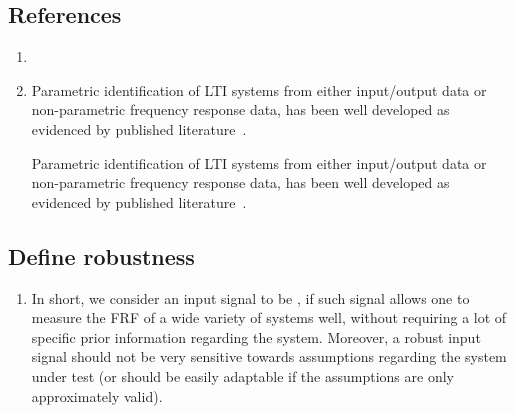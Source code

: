 \documentclass{responseletter}
\begin{document}
\subsection{References}
\begin{enumerate}
\item 
{}
\item 
{}
\begin{oldquote}
Parametric identification of \gls{LTI} systems from either input/output data or non-parametric frequency response data, has been well developed as evidenced by published literature~\citep{Pintelon2012,Ljung1999,Schoukens1999,Pintelon1998}.
\end{oldquote}
\begin{newquote}
Parametric identification of \gls{LTI} systems from either input/output data or non-parametric frequency response data, has been well developed as evidenced by published literature~\citep{Pintelon2012,Ljung1999,Schoukens1999,Pintelon1998,Soderstrom1989,Goodwin1977,Brillinger1981,Sanathanan1963,McKelvey2002,}.
\end{newquote}
\end{enumerate}


\subsection{Define robustness}

\begin{enumerate}
  \item {}
  \begin{newquote}
  In short, we consider an input signal to be , if such signal allows one to measure the \gls{FRF} of a wide variety of systems well, without requiring a lot of specific prior information regarding the system.
Moreover, a robust input signal should not be very sensitive towards assumptions regarding the system under test (or should be easily adaptable if the assumptions are only approximately valid).
  \end{newquote}
\end{enumerate}
\end{document}
